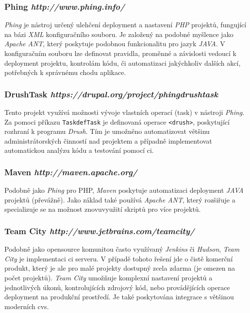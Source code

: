 \subsubsection*{\textbf{Phing} \hfill \emph{http://www.phing.info/}}
\label{subsec:phing}
\emph{Phing} je nástroj určený ulehčení \gls{deployment} a nastavení \emph{PHP} projektů, fungující na bázi \emph{XML} konfiguračního souboru. Je založený na podobné myšlence jako \emph{Apache ANT}, který poskytuje podobnou funkcionalitu pro jazyk \emph{JAVA}. V konfiguračním souboru lze definovat pravidla, proměnné a závislosti vedoucí k \gls{deployment} projektu, kontrolám kódu, či automatizaci jakýchkoliv dalších akcí, potřebných k správnému chodu aplikace.

\subsubsection*{\textbf{DrushTask} \hfill \emph{https://drupal.org/project/phingdrushtask}}
Tento projekt využívá možnosti vývoje vlastních operací (task) v nástroji \emph{Phing}. Za pomoci příkazu \texttt{TaskdefTask}\cite{website:phing-user-guide} je definovaná operace \texttt{<drush>}, poskytující rozhraní k programu \emph{Drush}. Tím je umožněno automatizovat většinu administrátorských činností nad projektem a případně implementovat automatickou analýzu kódu a testování pomocí \gls{ci}.

\subsubsection*{\textbf{Maven} \hfill \emph{http://maven.apache.org/}}
Podobně jako \emph{Phing} pro {PHP}, \emph{Maven} poskytuje automatizaci \gls{deployment} \emph{JAVA} projektů (převážně). Jako základ také používá \emph{Apache ANT}, který rozšiřuje a specializuje se na možnost znovuvyužití skriptů pro více projektů. 

\subsubsection*{\textbf{Team City} \hfill \emph{http://www.jetbrains.com/teamcity/}}
Podobně jako \gls{opensource} komunitou často využívaný \emph{Jenkins} či \emph{Hudson}, \emph{Team City} je implementaci \gls{ci} serveru. V případě tohoto řešení jde o čistě komerční produkt, který je ale pro malé projekty dostupný zcela zdarma (je omezen na počet projektů). \emph{Team City} umožňuje komplexní nastavení projektů a jednotlivých úkonů, kontrolujících zdrojový kód, nebo provádějících operace \gls{deployment} na produkční prostředí. Je také poskytována integrace s většinou moderních \gls{cvs}.

